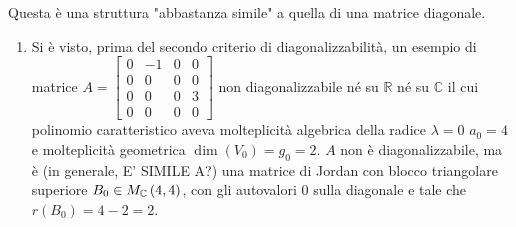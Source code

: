 \documentclass{article}
\begin{document}
Questa \`{e} una struttura "abbastanza simile" a quella di una matrice
diagonale.

\begin{enumerate}
\item Si \`{e} visto, prima del secondo criterio di diagonalizzabilit\`{a},
un esempio di matrice $A=\left[ 
\begin{array}{cccc}
0 & -1 & 0 & 0 \\ 
0 & 0 & 0 & 0 \\ 
0 & 0 & 0 & 3 \\ 
0 & 0 & 0 & 0%
\end{array}%
\right] $ non diagonalizzabile n\'{e} su $%
\mathbb{R}
$ n\'{e} su $%
\mathbb{C}
$ il cui polinomio caratteristico aveva molteplicit\`{a} algebrica della
radice $\lambda =0$ $a_{0}=4$ e molteplicit\`{a} geometrica $\dim \left(
V_{0}\right) =g_{0}=2$. $A$ non \`{e} diagonalizzabile, ma \`{e} (in
generale, E' SIMILE A?) una matrice di Jordan con blocco triangolare
superiore $B_{0}\in M_{%
\mathbb{C}
}\left( 4,4\right) $, con gli autovalori $0$ sulla diagonale e tale che $%
r\left( B_{0}\right) =4-2=2$.


\end{enumerate}
\end{document}
